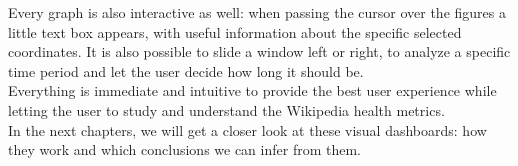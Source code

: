 Every graph is also interactive as well: when passing the cursor over the figures a little text box appears, with useful information about the specific selected coordinates. It is also possible to slide a window left or right, to analyze a specific time period and let the user decide how long it should be.\\
Everything is immediate and intuitive to provide the best user experience while letting the user to study and understand the Wikipedia health metrics.     \\
In the next chapters, we will get a closer look at these visual dashboards: how they work and which conclusions we can infer from them.
\\




